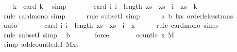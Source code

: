 \begin{isabellebody}
\isanewline
\ \ \isamarkupfalse%
\ {\isachardoublequoteopen}k{\isacharplus}{\kern0pt}{}\ {\isasymle}\ card\ {\isacharbraceleft}{\kern0pt}{}{\isachardot}{\kern0pt}{\isachardot}{\kern0pt}k{\isacharbraceright}{\kern0pt}{\isachardoublequoteclose}\ \isamarkupfalse%
\ simp\isanewline
\ \ \isamarkupfalse%
\ \isamarkupfalse%
\ {\isachardoublequoteopen}{\isachardot}{\kern0pt}{\isachardot}{\kern0pt}{\isachardot}{\kern0pt}\ {\isasymle}\ card\ {\isacharbraceleft}{\kern0pt}i{\isachardot}{\kern0pt}\ i\ {\isacharless}{\kern0pt}\ length\ xs\ {\isasymand}\ xs\ {\isacharbang}{\kern0pt}\ i\ {\isasymle}\ xs\ {\isacharbang}{\kern0pt}\ k{\isacharbraceright}{\kern0pt}{\isachardoublequoteclose}\isanewline
\ \ \ \ \isamarkupfalse%
\ {\isacharparenleft}{\kern0pt}rule\ card{\isacharunderscore}{\kern0pt}mono{\isacharcomma}{\kern0pt}\ simp{\isacharparenright}{\kern0pt}\isanewline
\ \ \ \ \isamarkupfalse%
\ {\isacharparenleft}{\kern0pt}rule\ subsetI{\isacharcomma}{\kern0pt}\ simp{\isacharparenright}{\kern0pt}\isanewline
\ \ \ \ \isamarkupfalse%
\ a\ b\ l{\isacharunderscore}{\kern0pt}xs\ order{\isacharunderscore}{\kern0pt}le{\isacharunderscore}{\kern0pt}less{\isacharunderscore}{\kern0pt}trans\ \isamarkupfalse%
\ auto\isanewline
\ \ \isamarkupfalse%
\ \isamarkupfalse%
\ {\isachardoublequoteopen}{\isachardot}{\kern0pt}{\isachardot}{\kern0pt}{\isachardot}{\kern0pt}\ {\isasymle}\ card\ {\isacharbraceleft}{\kern0pt}i{\isachardot}{\kern0pt}\ i\ {\isacharless}{\kern0pt}\ length\ xs\ {\isasymand}\ xs\ {\isacharbang}{\kern0pt}\ i\ {\isasymle}\ x{\isacharbraceright}{\kern0pt}{\isachardoublequoteclose}\isanewline
\ \ \ \ \isamarkupfalse%
\ {\isacharparenleft}{\kern0pt}rule\ card{\isacharunderscore}{\kern0pt}mono{\isacharcomma}{\kern0pt}\ simp{\isacharparenright}{\kern0pt}\isanewline
\ \ \ \ \isamarkupfalse%
\ {\isacharparenleft}{\kern0pt}rule\ subsetI{\isacharcomma}{\kern0pt}\ simp{\isacharparenright}{\kern0pt}\ \isamarkupfalse%
\ b\ \isanewline
\ \ \ \ \isamarkupfalse%
\ force\isanewline
\ \ \isamarkupfalse%
\ \isamarkupfalse%
\ {\isachardoublequoteopen}{\isachardot}{\kern0pt}{\isachardot}{\kern0pt}{\isachardot}{\kern0pt}\ {\isacharequal}{\kern0pt}\ count{\isacharunderscore}{\kern0pt}le\ x\ M{\isachardoublequoteclose}\isanewline
\ \ \ \ \isamarkupfalse%
\ {\isacharparenleft}{\kern0pt}simp\ add{\isacharcolon}{\kern0pt}count{\isacharunderscore}{\kern0pt}le{\isacharunderscore}{\kern0pt}def\ M{\isacharunderscore}{\kern0pt}xs{\isacharparenright}{\kern0pt}\isanewline

\end{isabellebody}
